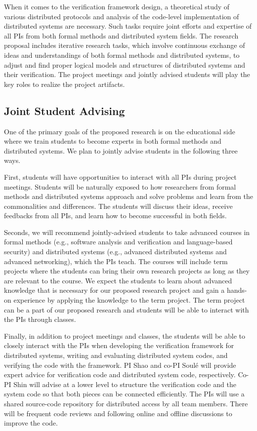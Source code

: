 \documentclass[11pt]{article}
\begin{document}
When it comes to the verification framework design, a theoretical
study of various distributed protocols and analysis of the code-level 
implementation of distributed systems are necessary. Such tasks require
joint efforts and expertise of all PIs from both formal methods and 
distributed system fields. The research proposal includes 
iterative research tasks, which involve continuous exchange 
of ideas and understandings of both formal methods and distributed 
systems, to adjust and find proper logical models and structures
of distributed systems and their verification. The project meetings 
and jointly advised students will play the key roles to realize the 
project artifacts. 

\subsection{Joint Student Advising}

One of the primary goals of the proposed research is on the educational
side where we train students to become experts in both formal
methods and distributed systems. We plan to jointly advise students
in the following three ways. 

First, students will have opportunities to interact with all PIs during
project meetings. Students will be naturally exposed to how 
researchers from formal methods and distributed systems approach and 
solve problems and learn from the commonalities and differences. The students
will discuss their ideas, receive feedbacks from all PIs, and learn how to 
become successful in both fields. 

Seconds, we will recommend jointly-advised students to take advanced 
courses in formal methods (e.g., software analysis and verification and language-based security) 
and distributed systems (e.g., advanced distributed systems and advanced networking), 
which the PIs teach. The courses will include term projects where the students 
can bring their own research projects as long as they are relevant to the course. 
We expect the students to learn about advanced knowledge that is necessary for 
our proposed research project and gain a hands-on experience by applying 
the knowledge to the term project. The term project can be a part of our 
proposed research and students will be able to interact with the PIs through
classes.

Finally, in addition to project meetings and classes, the students will be
able to closely interact with the PIs when developing the verification
framework for distributed systems, writing and evaluating distributed system 
codes, and verifying the code with the framework. PI Shao and co-PI Soul\'e
will provide expert advice for verification code and distributed system code,
respectively. Co-PI Shin will advise at a lower level to structure the verification 
code and the system code so that both pieces can be connected efficiently. 
The PIs will use a shared source-code repository for distributed 
access by all team members. There will be frequent code reviews and following
online and offline discussions to improve the code. 
\end{document}
